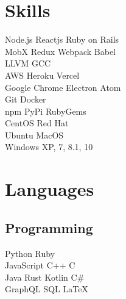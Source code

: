 \documentclass[]{resume}
\begin{document}
\begin{minipage}[t]{0.30\textwidth}

\section{Skills}
Node.js \textbullet{} Reactjs \textbullet{} Ruby on Rails \\
MobX \textbullet{} Redux \textbullet{} Webpack \textbullet{} Babel \\
LLVM \textbullet{} GCC \\

AWS \textbullet{} Heroku \textbullet{} Vercel \\
Google Chrome \textbullet{} Electron \textbullet{} Atom \\

Git \textbullet{} Docker \\
npm \textbullet{} PyPi \textbullet{} RubyGems \\

CentOS \textbullet{} Red Hat \\
Ubuntu \textbullet{} MacOS \\
Windows XP, 7, 8.1, 10 \\

\sectionsep


\section{Languages}
\subsection{Programming}
Python \textbullet{} Ruby \\
JavaScript \textbullet{} C++ \textbullet{} C \\
Java \textbullet{} Rust \textbullet{} Kotlin \textbullet{} C\# \\
GraphQL \textbullet{} SQL \textbullet{} \LaTeX \\


\end{minipage}
\end{document}
